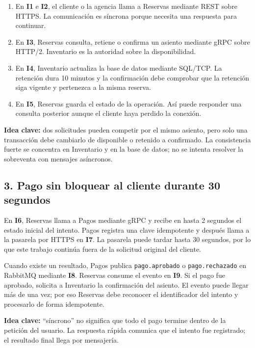 \documentclass[11pt,a4paper]{article}
\newcommand{\interaccion}[1]{\textbf{I#1}}
\begin{document}
\begin{enumerate}[leftmargin=*,itemsep=2pt]
  \item En \interaccion{1} e \interaccion{2}, el cliente o la agencia llama a Reservas mediante REST sobre HTTPS. La comunicación es síncrona porque necesita una respuesta para continuar.
  \item En \interaccion{3}, Reservas consulta, retiene o confirma un asiento mediante gRPC sobre HTTP/2. Inventario es la autoridad sobre la disponibilidad.
  \item En \interaccion{4}, Inventario actualiza la base de datos mediante SQL/TCP. La retención dura 10 minutos y la confirmación debe comprobar que la retención siga vigente y pertenezca a la misma reserva.
  \item En \interaccion{5}, Reservas guarda el estado de la operación. Así puede responder una consulta posterior aunque el cliente haya perdido la conexión.
\end{enumerate}

\textbf{Idea clave:} dos solicitudes pueden competir por el mismo asiento, pero solo una transacción debe cambiarlo de disponible o retenido a confirmado. La consistencia fuerte se concentra en Inventario y en la base de datos; no se intenta resolver la sobreventa con mensajes asíncronos.

\subsection*{3. Pago sin bloquear al cliente durante 30 segundos}

En \interaccion{6}, Reservas llama a Pagos mediante gRPC y recibe en hasta 2 segundos el estado inicial del intento. Pagos registra una clave idempotente y después llama a la pasarela por HTTPS en \interaccion{7}. La pasarela puede tardar hasta 30 segundos, por lo que este trabajo continúa fuera de la solicitud original del cliente.

Cuando existe un resultado, Pagos publica \texttt{pago.aprobado} o \texttt{pago.rechazado} en RabbitMQ mediante \interaccion{8}. Reservas consume el evento en \interaccion{9}. Si el pago fue aprobado, solicita a Inventario la confirmación del asiento. El evento puede llegar más de una vez; por eso Reservas debe reconocer el identificador del intento y procesarlo de forma idempotente.

\textbf{Idea clave:} ``síncrono'' no significa que todo el pago termine dentro de la petición del usuario. La respuesta rápida comunica que el intento fue registrado; el resultado final llega por mensajería.
\end{document}
